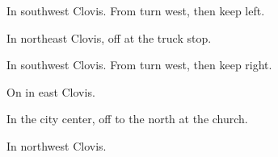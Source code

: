 
\begin{LocationList}

In southwest Clovis.
From  turn west, then keep left.

In northeast Clovis, off    at the truck stop.

In southwest Clovis.
From  turn west, then keep right.

\Location{\TruckStop \Gas \Rest \Service}
On    in east Clovis.

In the city center, off   to the north at the church.

In northwest Clovis.

\end{LocationList}
